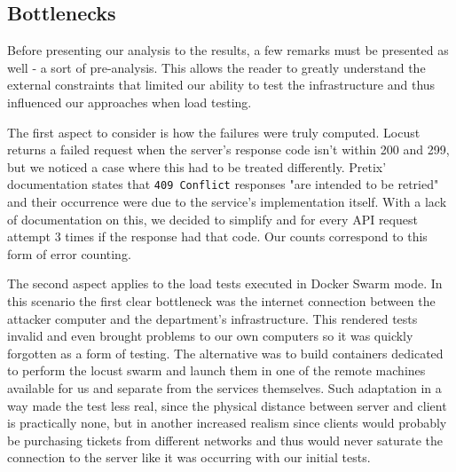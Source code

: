 \documentclass[12pt]{article}
\begin{document}





\subsection{Bottlenecks} \label{performance.bottlenecks} %


Before presenting our analysis to the results, a few remarks must be presented as well - a sort of pre-analysis.
This allows the reader to greatly understand the external constraints that limited our ability to test the infrastructure and thus influenced our approaches 
when load testing.

The first aspect to consider is how the failures were truly computed.
Locust returns a failed request when the server's response code isn't within 200 and 299, but we noticed a case where this had to be treated differently.
Pretix' documentation states that \texttt{409 Conflict} responses "are intended to be retried" and their occurrence were due to the service's implementation itself.
With a lack of documentation on this, we decided to simplify and for every API request attempt 3 times if the response had that code.
Our counts correspond to this form of error counting.

The second aspect applies to the load tests executed in Docker Swarm mode.
In this scenario the first clear bottleneck was the internet connection between the attacker computer and the department's infrastructure.
This rendered tests invalid and even brought problems to our own computers so it was quickly forgotten as a form of testing.
The alternative was to build containers dedicated to perform the locust swarm and launch them in one of the remote machines available for us and separate from 
the services themselves.
Such adaptation in a way made the test less real, since the physical distance between server and client is practically none, but in another increased realism 
since clients would probably be purchasing tickets from different networks and thus would never saturate the connection to the server like it was occurring with 
our initial tests. \\
\end{document}
